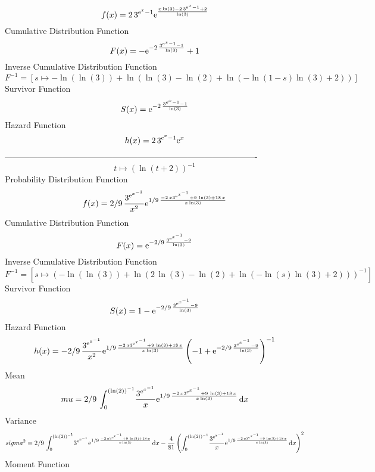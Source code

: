 \documentclass[12pt]{article}
\begin{document}
$$  f(x)=2\,{3}^{{{\rm e}^{x}}-1}{{\rm e}^{{\frac {x\ln  \left( 3 \right) -2\,{
3}^{{{\rm e}^{x}}-1}+2}{\ln  \left( 3 \right) }}}}
$$Cumulative Distribution Function  
 $$F(x)=-{{\rm e}^{-2\,{\frac {{3}^{{{\rm e}^{x}}-1}-1}{\ln  \left( 3 \right) 
}}}}+1
$$ Inverse Cumulative Distribution Function 
  $$F^{-1} = [s\mapsto -\ln  \left( \ln  \left( 3 \right)  \right) +\ln  \left( 
\ln  \left( 3 \right) -\ln  \left( 2 \right) +\ln  \left( -\ln 
 \left( 1-s \right) \ln  \left( 3 \right) +2 \right)  \right) ]
$$Survivor Function 
 $$ S(x)={{\rm e}^{-2\,{\frac {{3}^{{{\rm e}^{x}}-1}-1}{\ln  \left( 3 \right) }
}}}
$$ Hazard Function 
 $$ h(x)=2\,{3}^{{{\rm e}^{x}}-1}{{\rm e}^{x}}
$$-------------------------------------------------------------------------------------------  \\$$t\mapsto  \left( \ln  \left( t+2 \right)  \right) ^{-1}
$$Probability Distribution Function 
$$  f(x)=2/9\,{\frac {{3}^{{{\rm e}^{{x}^{-1}}}}}{{x}^{2}}{{\rm e}^{1/9\,{
\frac {-2\,x{3}^{{{\rm e}^{{x}^{-1}}}}+9\,\ln  \left( 3 \right) +18\,x
}{x\ln  \left( 3 \right) }}}}}
$$Cumulative Distribution Function  
 $$F(x)={{\rm e}^{-2/9\,{\frac {{3}^{{{\rm e}^{{x}^{-1}}}}-9}{\ln  \left( 3
 \right) }}}}
$$ Inverse Cumulative Distribution Function 
  $$F^{-1} = [s\mapsto  \left( -\ln  \left( \ln  \left( 3 \right)  \right) +\ln 
 \left( 2\,\ln  \left( 3 \right) -\ln  \left( 2 \right) +\ln  \left( -
\ln  \left( s \right) \ln  \left( 3 \right) +2 \right)  \right) 
 \right) ^{-1}]
$$Survivor Function 
 $$ S(x)=1-{{\rm e}^{-2/9\,{\frac {{3}^{{{\rm e}^{{x}^{-1}}}}-9}{\ln  \left( 3
 \right) }}}}
$$ Hazard Function 
 $$ h(x)=-2/9\,{\frac {{3}^{{{\rm e}^{{x}^{-1}}}}}{{x}^{2}}{{\rm e}^{1/9\,{
\frac {-2\,x{3}^{{{\rm e}^{{x}^{-1}}}}+9\,\ln  \left( 3 \right) +18\,x
}{x\ln  \left( 3 \right) }}}} \left( -1+{{\rm e}^{-2/9\,{\frac {{3}^{{
{\rm e}^{{x}^{-1}}}}-9}{\ln  \left( 3 \right) }}}} \right) ^{-1}}
$$Mean 
 $$ mu=2/9\,\int_{0}^{ \left( \ln  \left( 2 \right)  \right) ^{-1}}\!{\frac {
{3}^{{{\rm e}^{{x}^{-1}}}}}{x}{{\rm e}^{1/9\,{\frac {-2\,x{3}^{{
{\rm e}^{{x}^{-1}}}}+9\,\ln  \left( 3 \right) +18\,x}{x\ln  \left( 3
 \right) }}}}}\,{\rm d}x
$$ Variance 
 $$ sigma^2 = 2/9\,\int_{0}^{ \left( \ln  \left( 2 \right)  \right) ^{-1}}\!{3}^{{
{\rm e}^{{x}^{-1}}}}{{\rm e}^{1/9\,{\frac {-2\,x{3}^{{{\rm e}^{{x}^{-1
}}}}+9\,\ln  \left( 3 \right) +18\,x}{x\ln  \left( 3 \right) }}}}
\,{\rm d}x-{\frac {4}{81} \left( \int_{0}^{ \left( \ln  \left( 2
 \right)  \right) ^{-1}}\!{\frac {{3}^{{{\rm e}^{{x}^{-1}}}}}{x}{
{\rm e}^{1/9\,{\frac {-2\,x{3}^{{{\rm e}^{{x}^{-1}}}}+9\,\ln  \left( 3
 \right) +18\,x}{x\ln  \left( 3 \right) }}}}}\,{\rm d}x \right) ^{2}}
$$Moment Function 
\end{document}

